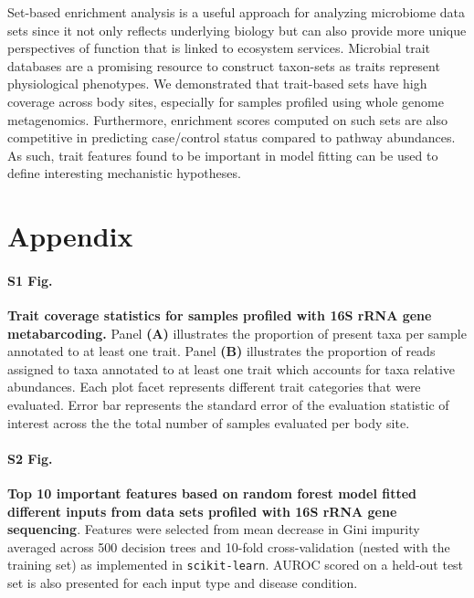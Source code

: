 \documentclass{bmcart}
\begin{document}
Set-based enrichment analysis is a useful approach for analyzing microbiome data sets since it not only reflects underlying biology but can also provide more unique perspectives of function that is linked to ecosystem services. Microbial trait databases are a promising resource to construct taxon-sets as traits represent physiological phenotypes. We demonstrated that trait-based sets have high coverage across body sites, especially for samples profiled using whole genome metagenomics. Furthermore, enrichment scores computed on such sets are also competitive in predicting case/control status compared to pathway abundances. As such, trait features found to be important in model fitting can be used to define interesting mechanistic hypotheses. 

\section*{Appendix}
\paragraph*{S1 Fig.}
\label{S1_Fig}
{\bf Trait coverage statistics for samples profiled with 16S rRNA gene metabarcoding.} Panel \textbf{(A)} illustrates the proportion of present taxa per sample annotated to at least one trait. Panel \textbf{(B)} illustrates the proportion of reads assigned to taxa annotated to at least one trait which accounts for taxa relative abundances. Each plot facet represents different trait categories that were evaluated. Error bar represents the standard error of the evaluation statistic of interest across the the total number of samples evaluated per body site.

\paragraph*{S2 Fig.}
\label{S2_Fig}
{\bf Top 10 important features based on random forest model fitted different inputs from data sets profiled with 16S rRNA gene sequencing}. Features were selected from mean decrease in Gini impurity averaged across 500 decision trees and 10-fold cross-validation (nested with the training set) as implemented in \texttt{scikit-learn}. AUROC scored on a held-out test set is also presented for each input type and disease condition.
\end{document}
